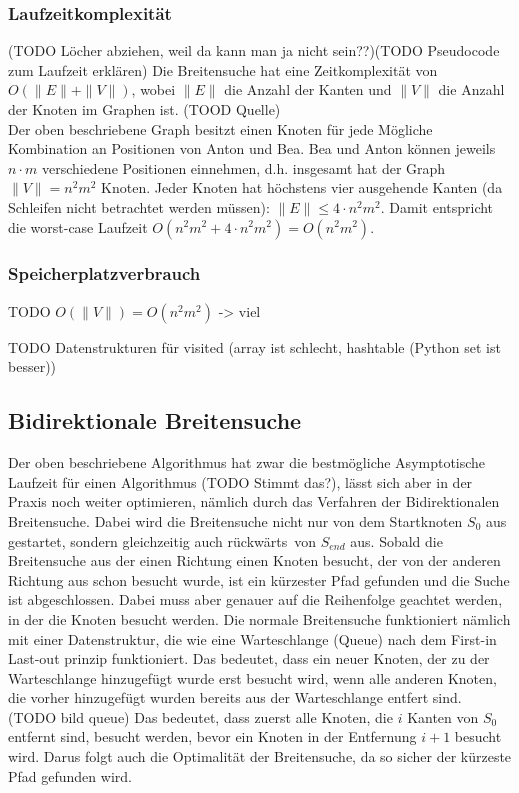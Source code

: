 \documentclass[a4paper,10pt,ngerman]{scrartcl}
\begin{document}
\subsubsection{Laufzeitkomplexität} (TODO Löcher abziehen, weil da kann man ja nicht sein??)(TODO Pseudocode zum Laufzeit erklären)
Die Breitensuche hat eine Zeitkomplexität von $O(\|E\| + \|V\|)$, wobei $\|E\|$ die Anzahl der Kanten und $\|V\|$ die Anzahl der Knoten im Graphen ist. (TOOD Quelle) \\
Der oben beschriebene Graph besitzt einen Knoten für jede Mögliche Kombination an Positionen von Anton und Bea. Bea und Anton können jeweils $n \cdot m$ verschiedene Positionen einnehmen, d.h. insgesamt hat der Graph $\|V\| = n^2 m^2$ Knoten.
Jeder Knoten hat höchstens vier ausgehende Kanten (da Schleifen nicht betrachtet werden müssen): $\|E\| \le 4 \cdot n ^2 m^2$. Damit entspricht die worst-case Laufzeit $O(n^2 m^2 + 4 \cdot n^2 m^2) = O(n^2 m^2)$.

\subsubsection{Speicherplatzverbrauch}
TODO $O(\| V \|) = O(n^2 m^2)$ -> viel


TODO Datenstrukturen für visited (array ist schlecht, hashtable (Python set ist besser))

\subsection{Bidirektionale Breitensuche}
Der oben beschriebene Algorithmus hat zwar die bestmögliche Asymptotische Laufzeit für einen Algorithmus (TODO Stimmt das?), lässt sich aber in der Praxis noch weiter optimieren, nämlich durch das Verfahren der Bidirektionalen Breitensuche. Dabei wird die Breitensuche nicht nur von dem Startknoten $S_0$ aus gestartet, sondern gleichzeitig auch \glqq rückwärts\grqq~von $S_{end}$ aus. Sobald die Breitensuche aus der einen Richtung einen Knoten besucht, der von der anderen Richtung aus schon besucht wurde, ist ein kürzester Pfad gefunden und die Suche ist abgeschlossen.
Dabei muss aber genauer auf die Reihenfolge geachtet werden, in der die Knoten besucht werden.
Die normale Breitensuche funktioniert nämlich mit einer Datenstruktur, die wie eine Warteschlange (Queue) nach dem First-in Last-out prinzip funktioniert. Das bedeutet, dass ein neuer Knoten, der zu der Warteschlange hinzugefügt wurde erst besucht wird, wenn alle anderen Knoten, die vorher hinzugefügt wurden bereits aus der Warteschlange entfert sind. (TODO bild queue) Das bedeutet, dass zuerst alle Knoten, die $i$ Kanten von $S_0$ entfernt sind, besucht werden, bevor ein Knoten in der Entfernung $i+1$ besucht wird. Darus folgt auch die Optimalität der Breitensuche, da so sicher der kürzeste Pfad gefunden wird. \\
\end{document}
